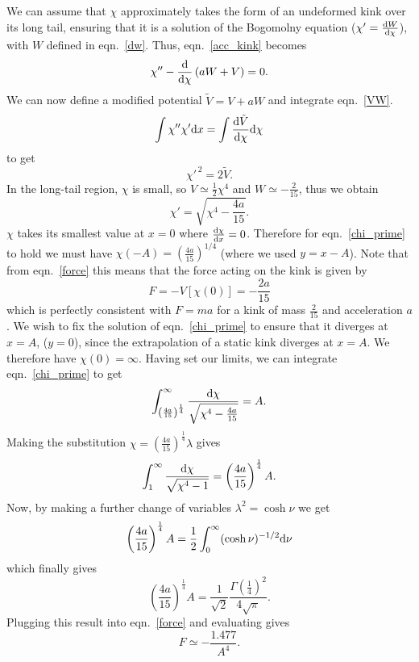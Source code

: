 \documentclass[11pt, oneside]{article}  	%
\numberwithin{equation}{section}
\newcommand{\drv}{\ensuremath{\textup{d}}}
\begin{document}
We can assume that $\chi$ approximately takes the form of an undeformed kink over its long tail, ensuring that it is a solution of the Bogomolny equation ($\chi' = \frac{\drv W }{\drv \chi}$), with $W$ defined in eqn.~\ref{dw}. Thus, eqn.~\ref{acc_kink} becomes
\begin{equation}\label{VW}
\chi'' -\frac{\drv}{\drv \chi}\left ( aW + V \right ) =0.
\end{equation}
We can now define a modified potential $\tilde{V} = V +aW$ and integrate eqn.~\ref{VW}.
\begin{equation}
\int \chi'' \chi' \drv x = \int \frac{\drv \tilde{V}}{\drv \chi} \drv \chi
\end{equation}
to get
\begin{equation}
\chi'^{\,2} = 2 \tilde{V}.
\end{equation}
In the long-tail region, $\chi$ is small, so $V\simeq \frac{1}{2}\chi^4$ and $W\simeq -\frac{2}{15}$, thus we obtain
\begin{equation}\label{chi_prime}
\chi' = \sqrt{\chi^4 - \frac{4a}{15}}.
\end{equation}
$\chi$ takes its smallest value at $x=0$ where $\frac{\drv\chi}{\drv x}=0$. Therefore for eqn.~\ref{chi_prime} to hold we must have $\chi(-A) = \left( \frac{4a}{15} \right)^{1/4}$ (where we used $y = x-A$). Note that from eqn.~\ref{force} this means that the force acting on the kink is given by
\begin{equation}
F = -V\left[\chi(0)\right] = -\frac{2a}{15}
\end{equation}
which is perfectly consistent with $F = ma$ for a kink of mass $\frac{2}{15}$ and acceleration $a$. We wish to fix the solution of eqn.~\ref{chi_prime} to ensure that it diverges at $x = A$, ($y = 0$), since the extrapolation of a static kink diverges at $x=A$. We therefore have $\chi(0) = \infty$. Having set our limits, we can integrate eqn.~\ref{chi_prime} to get
\begin{equation}
\int_{ \left( \frac{4a}{15} \right)^{\frac{1}{4}}}^{\infty}\frac{\drv \chi}{\sqrt{\chi^4 - \frac{4a}{15}}} = A.
\end{equation}
Making the substitution $\chi =\left( \frac{4a}{15}\right)^{\frac{1}{4}}\lambda$ gives
\begin{equation}
 \int_{1}^{\infty}\frac{\drv \chi}{\sqrt{\chi^4 - 1}} = \left( \frac{4a}{15}\right)^{\frac{1}{4}} A.
\end{equation}
Now, by making a further change of variables $\lambda^2 = \cosh\nu$ we get
\begin{equation}
 \left( \frac{4a}{15}\right)^{\frac{1}{4}} A = \frac{1}{2}\int_{0}^{\infty} (\cosh\nu)^{-1/2}\drv \nu
\end{equation}
which finally gives
\begin{equation}
 \left( \frac{4a}{15}\right)^{\frac{1}{4}} A =\frac{1}{\sqrt{2}}\frac{\Gamma \left( \frac{1}{4}\right)^2}{4\sqrt{\pi}}.
\end{equation}
Plugging this result into eqn.~\ref{force} and evaluating gives
\begin{equation} \label{prediction}
F \simeq -\frac{1.477}{A^4}.
\end{equation}
\end{document}
